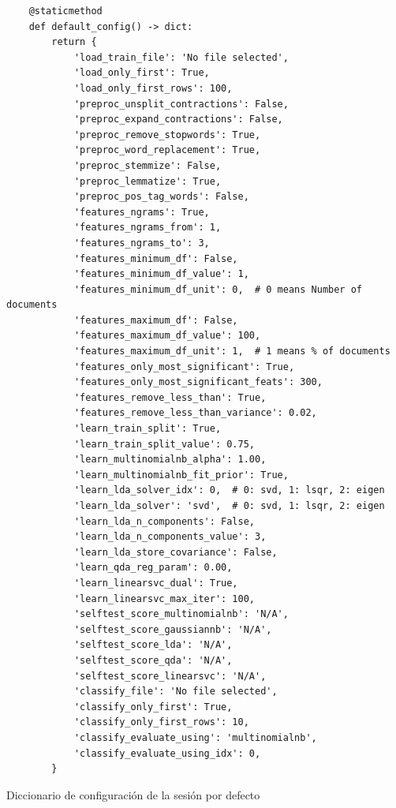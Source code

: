 \begin{listing}[phtb]
\begin{verbatim}
    @staticmethod
    def default_config() -> dict:
        return {
            'load_train_file': 'No file selected',
            'load_only_first': True,
            'load_only_first_rows': 100,
            'preproc_unsplit_contractions': False,
            'preproc_expand_contractions': False,
            'preproc_remove_stopwords': True,
            'preproc_word_replacement': True,
            'preproc_stemmize': False,
            'preproc_lemmatize': True,
            'preproc_pos_tag_words': False,
            'features_ngrams': True,
            'features_ngrams_from': 1,
            'features_ngrams_to': 3,
            'features_minimum_df': False,
            'features_minimum_df_value': 1,
            'features_minimum_df_unit': 0,  # 0 means Number of documents
            'features_maximum_df': False,
            'features_maximum_df_value': 100,
            'features_maximum_df_unit': 1,  # 1 means % of documents
            'features_only_most_significant': True,
            'features_only_most_significant_feats': 300,
            'features_remove_less_than': True,
            'features_remove_less_than_variance': 0.02,
            'learn_train_split': True,
            'learn_train_split_value': 0.75,
            'learn_multinomialnb_alpha': 1.00,
            'learn_multinomialnb_fit_prior': True,
            'learn_lda_solver_idx': 0,  # 0: svd, 1: lsqr, 2: eigen
            'learn_lda_solver': 'svd',  # 0: svd, 1: lsqr, 2: eigen
            'learn_lda_n_components': False,
            'learn_lda_n_components_value': 3,
            'learn_lda_store_covariance': False,
            'learn_qda_reg_param': 0.00,
            'learn_linearsvc_dual': True,
            'learn_linearsvc_max_iter': 100,
            'selftest_score_multinomialnb': 'N/A',
            'selftest_score_gaussiannb': 'N/A',
            'selftest_score_lda': 'N/A',
            'selftest_score_qda': 'N/A',
            'selftest_score_linearsvc': 'N/A',
            'classify_file': 'No file selected',
            'classify_only_first': True,
            'classify_only_first_rows': 10,
            'classify_evaluate_using': 'multinomialnb',
            'classify_evaluate_using_idx': 0,
        }
\end{verbatim}
\caption{Diccionario de configuración de la sesión por defecto}
\label{lst:default-dict}
\end{listing}

\FloatBarrier
